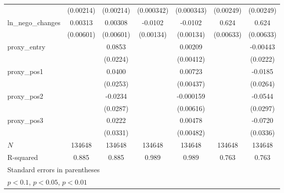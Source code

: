 {\begin{tabular}{l*{6}{c}}
            &   (0.00214)         &   (0.00214)         &  (0.000342)         &  (0.000343)         &   (0.00249)         &   (0.00249)         \\
\addlinespace
ln\_nego\_changes&     0.00313         &     0.00308         &     -0.0102\sym{***}&     -0.0102\sym{***}&       0.624\sym{***}&       0.624\sym{***}\\
            &   (0.00601)         &   (0.00601)         &   (0.00134)         &   (0.00134)         &   (0.00633)         &   (0.00633)         \\
\addlinespace
proxy\_entry &                     &      0.0853\sym{***}&                     &     0.00209         &                     &    -0.00443         \\
            &                     &    (0.0224)         &                     &   (0.00412)         &                     &    (0.0222)         \\
\addlinespace
proxy\_pos1  &                     &      0.0400         &                     &     0.00723\sym{*}  &                     &     -0.0185         \\
            &                     &    (0.0253)         &                     &   (0.00437)         &                     &    (0.0264)         \\
\addlinespace
proxy\_pos2  &                     &     -0.0234         &                     &   -0.000159         &                     &     -0.0544\sym{*}  \\
            &                     &    (0.0287)         &                     &   (0.00616)         &                     &    (0.0297)         \\
\addlinespace
proxy\_pos3  &                     &      0.0222         &                     &     0.00478         &                     &     -0.0720\sym{**} \\
            &                     &    (0.0331)         &                     &   (0.00482)         &                     &    (0.0336)         \\
\midrule
\(N\)       &      134648         &      134648         &      134648         &      134648         &      134648         &      134648         \\
R-squared   &       0.885         &       0.885         &       0.989         &       0.989         &       0.763         &       0.763         \\
\bottomrule
\multicolumn{7}{l}{\footnotesize Standard errors in parentheses}\\
\multicolumn{7}{l}{\footnotesize \sym{*} \(p<0.1\), \sym{**} \(p<0.05\), \sym{***} \(p<0.01\)}\\
\end{tabular}
}
